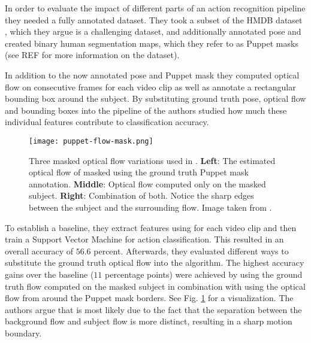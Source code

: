 In order to evaluate the impact of different parts of an action recognition pipeline they needed a fully annotated dataset.
They took a subset of the HMDB dataset \cite{kuehne_hmdb:_2011}, which they argue is a challenging dataset, and additionally annotated pose and created binary human segmentation maps, which they refer to as Puppet masks (see REF for more information on the dataset). %

In addition to the now annotated pose and Puppet mask they computed optical flow on consecutive frames for each video clip as well as annotate a rectangular bounding box around the subject.
By substituting ground truth pose, optical flow and bounding boxes into the pipeline of \cite{wang_dense_2013} the authors studied how much these individual features contribute to classification accuracy.

\begin{figure}[htb!]
    \centering
    \texttt{[image: puppet-flow-mask.png]}
    \caption{Three masked optical flow variations used in \cite{jhuang_towards_2013}. \textbf{Left}: The estimated optical flow of \cite{wang_dense_2013} masked using the ground truth Puppet mask annotation. \textbf{Middle}: Optical flow computed only on the masked subject. \textbf{Right}: Combination of both. Notice the sharp edges between the subject and the surrounding flow. Image taken from \cite{jhuang_towards_2013}. }
    \label{fig:puppet-flow-mask}
\end{figure}

To establish a baseline, they extract features using \cite{wang_dense_2013} for each video clip and then train a Support Vector Machine for action classification.
This resulted in an overall accuracy of $56.6$ percent.
Afterwards, they evaluated different ways to substitute the ground truth optical flow into the algorithm.
The highest accuracy gains over the baseline ($11$ percentage points) were achieved by using the ground truth flow computed on the masked subject in combination with using the optical flow from around the Puppet mask borders.
See Fig. \ref{fig:puppet-flow-mask} for a visualization.
The authors argue that is most likely due to the fact that the separation between the background flow and subject flow is more distinct, resulting in a sharp motion boundary. 

